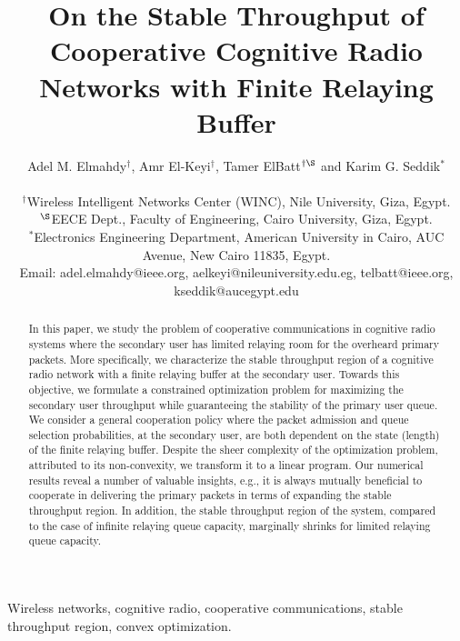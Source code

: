 \documentclass[conference]{IEEEtran}
\begin{document}
\title{On the Stable Throughput of Cooperative Cognitive Radio Networks with Finite Relaying Buffer}
\author{\large Adel M. Elmahdy$^{\dag}$, Amr El-Keyi$^{\dag}$, Tamer ElBatt$^{\dag\S}$ and Karim G. Seddik$^*$\\ [.1in]
\normalsize
\begin{tabular}{c}
$^{\dag}$Wireless Intelligent Networks Center (WINC), Nile University, Giza, Egypt.\\
$^{\S}$EECE Dept., Faculty of Engineering, Cairo University, Giza, Egypt.\\
$^*$Electronics Engineering Department, American University in Cairo, AUC Avenue, New Cairo 11835, Egypt.\\
Email: adel.elmahdy@ieee.org, aelkeyi@nileuniversity.edu.eg, telbatt@ieee.org, kseddik@aucegypt.edu
\end{tabular}
}
\maketitle

\begin{abstract}
In this paper, we study the problem of cooperative communications
in cognitive radio systems where the secondary user has limited
relaying room for the overheard primary packets. More
specifically, we characterize the stable throughput region of a
cognitive radio network with a finite relaying buffer at the
secondary user. Towards this objective, we formulate a constrained
optimization problem for maximizing the secondary user throughput 
while guaranteeing the stability of the primary user
queue. We consider a general cooperation policy where the packet
admission and queue selection probabilities, at the secondary
user, are both dependent on the state (length) of the finite
relaying buffer. Despite the sheer complexity of the optimization
problem, attributed to its non-convexity, we transform it to a 
linear program. Our numerical
results reveal a number of valuable insights, e.g., it is always
mutually beneficial to cooperate in delivering the primary packets
in terms of expanding the stable throughput region. In addition,
the stable throughput region of the system, compared to the case of 
infinite relaying queue capacity, marginally shrinks for limited relaying queue capacity.

\end{abstract}

\begin{IEEEkeywords}
Wireless networks, cognitive radio, cooperative communications, stable throughput region, convex optimization.
\end{IEEEkeywords}
\end{document}
